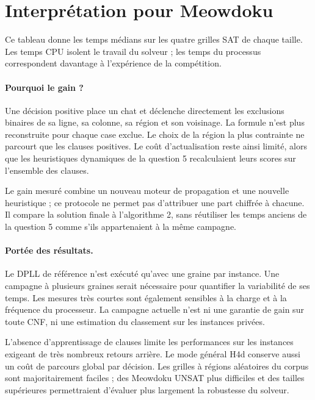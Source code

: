 \documentclass[10pt,a4paper]{article}
\begin{document}
\clearpage
\section{Interprétation pour Meowdoku}

\begin{center}\footnotesize\setlength{\tabcolsep}{4pt}

\end{center}
Ce tableau donne les temps médians sur les quatre grilles SAT de chaque
taille. Les temps CPU isolent le travail du solveur ; les temps du processus
correspondent davantage à l'expérience de la compétition.



\paragraph{Pourquoi le gain ?} Une décision positive place un chat et
déclenche directement les exclusions binaires de sa ligne, sa colonne,
sa région et son voisinage. La formule n'est plus reconstruite pour chaque
case exclue. Le choix de la région la plus contrainte ne parcourt que les
clauses positives. Le coût d'actualisation reste ainsi limité, alors que
les heuristiques dynamiques de la question 5 recalculaient leurs scores
sur l'ensemble des clauses.

Le gain mesuré combine un nouveau moteur de propagation et une nouvelle
heuristique ; ce protocole ne permet pas d'attribuer une part chiffrée à
chacune. Il compare la solution finale à l'algorithme 2, sans réutiliser
les temps anciens de la question 5 comme s'ils appartenaient à la même
campagne.

\paragraph{Portée des résultats.} Le DPLL de référence n'est exécuté
qu'avec une graine par instance. Une campagne à plusieurs graines serait
nécessaire pour quantifier la variabilité de ses temps. Les mesures très
courtes sont également sensibles à la charge et à la fréquence du
processeur. La campagne actuelle n'est ni une garantie de gain sur toute
CNF, ni une estimation du classement sur les instances privées.

L'absence d'apprentissage de clauses limite les performances sur les
instances exigeant de très nombreux retours arrière. Le mode général H4d
conserve aussi un coût de parcours global par décision. Les grilles à
régions aléatoires du corpus sont majoritairement faciles ; des Meowdoku
UNSAT plus difficiles et des tailles supérieures permettraient d'évaluer
plus largement la robustesse du solveur.
\end{document}
